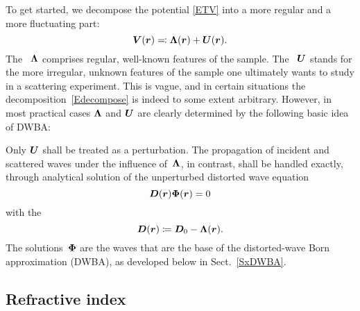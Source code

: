 To get started,
we decompose the potential \cref{ETV}
into a more regular and a more fluctuating part:
\begin{equation}\label{Edecompose}
  \TV(\r) \eqqcolon \TL(\r) + \TU(\r).
\end{equation}
The ~$\bm{\Lambda}$
%
%
comprises regular, well-known features of the sample.
The ~$\bm{U}$
%
%
%
stands for the more irregular, unknown features of the sample
one ultimately wants to study in a scattering experiment.
This is vague,
and in certain situations the decomposition~\cref{Edecompose} is indeed
to some extent arbitrary.
However, in most practical cases $\bm{\Lambda}$ and $\bm{U}$ are clearly determined by
the following basic idea of DWBA:

Only $\bm{U}$ shall be treated as a perturbation.
The propagation of incident and scattered waves under the influence of~$\bm{\Lambda}$,
in contrast,
shall be handled exactly,
through analytical solution of the unperturbed distorted wave equation
%
%
%
\begin{equation}\label{EDPsi0}
  \TD(\r)\v\Phi(\r) = 0
\end{equation}
with the 
%
%
%
\begin{equation}
  \bm{D}(\bm{r}) \coloneqq \bm{D}_0 - \bm{\Lambda}(\bm{r}).
\end{equation}
The solutions~$\bm{\Phi}$ are the  waves
%
%
that are the base of the distorted-wave Born approximation (DWBA),
as developed below in Sect.~\ref{SxDWBA}.

\subsection{Refractive index}\label{Sri1}

